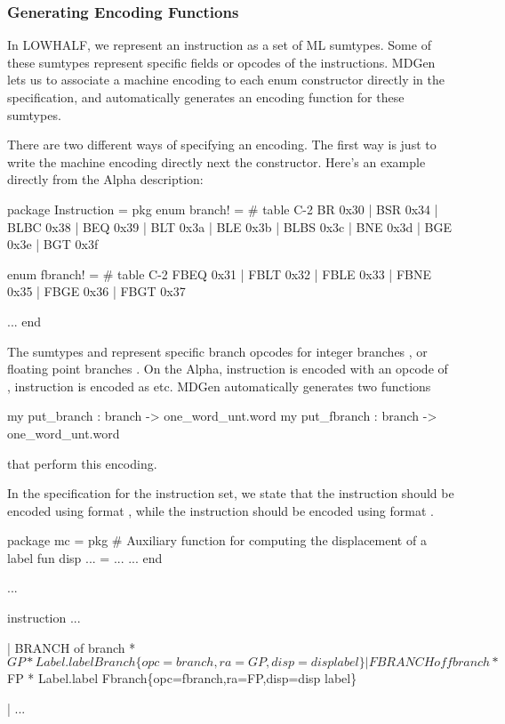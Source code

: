 \subsubsection{Generating Encoding Functions}

   In LOWHALF, we represent an instruction as a set of ML sumtypes.
Some of these sumtypes represent specific fields or 
opcodes of the instructions.
MDGen lets us to associate a machine encoding to each enum constructor
directly in the specification, and automatically generates an 
encoding function for these sumtypes.

There are two different ways of specifying an encoding.  The first way
is just to write the machine encoding directly next the constructor.
Here's an example directly from the Alpha description:
\begin{SML}
   package Instruction =
   pkg
      enum branch! =  #  table C-2 
         BR   0x30
                   | BSR 0x34
                              | BLBC 0x38
       | BEQ  0x39 | BLT 0x3a | BLE  0x3b
       | BLBS 0x3c | BNE 0x3d | BGE  0x3e
       | BGT  0x3f

      enum fbranch! = #  table C-2 
                     FBEQ 0x31 | FBLT 0x32
       | FBLE 0x33             | FBNE 0x35
       | FBGE 0x36 | FBGT 0x37

      ...
   end
\end{SML}

The sumtypes  and  represent specific
branch opcodes for integer branches , or floating point
branches .  On the Alpha, instruction  is encoded
with an opcode of , instruction  is encoded 
as  etc.  MDGen automatically generates two functions
\begin{SML}
    my put_branch : branch -> one_word_unt.word
    my put_fbranch : branch -> one_word_unt.word
\end{SML}
that perform this encoding.    

In the specification for the instruction set, we state that the
 instruction should be encoded using format ,
while the  instruction should be encoded using
format .
\begin{SML}
   package mc =
   pkg
      #  Auxiliary function for computing the displacement of a label 
      fun disp ... = ...
      ...
   end

   ...

   instruction
     ...

   | BRANCH of branch * $GP * Label.label
     Branch\{opc=branch,ra=GP,disp=disp label\}

   | FBRANCH of fbranch * $FP * Label.label
     Fbranch\{opc=fbranch,ra=FP,disp=disp label\}

   | ...
\end{SML}

